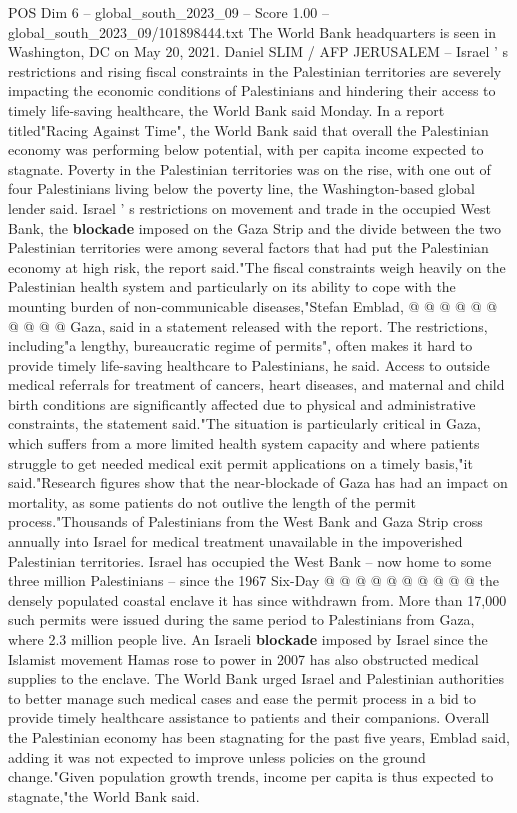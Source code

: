 \begin{textsample}{POS Dim 6 – global\_south\_2023\_09 – Score 1.00 – global\_south\_2023\_09/101898444.txt}  \label{ex:f6_pos_382}
The World Bank headquarters is seen in Washington, DC on May 20, 2021.
Daniel SLIM / AFP JERUSALEM -- Israel ' s restrictions and rising fiscal constraints in the Palestinian territories are severely impacting the economic conditions of Palestinians and hindering their access to timely life-saving healthcare, the World Bank said Monday.
In a report titled"Racing Against Time", the World Bank said that overall the Palestinian economy was performing below potential, with per capita income expected to stagnate.
Poverty in the Palestinian territories was on the rise, with one out of four Palestinians living below the poverty line, the Washington-based global lender said.
Israel ' s restrictions on movement and trade in the occupied West Bank, the \textbf{blockade} imposed on the Gaza Strip and the divide between the two Palestinian territories were among several factors that had put the Palestinian economy at high risk, the report said."The fiscal constraints weigh heavily on the Palestinian health system and particularly on its ability to cope with the mounting burden of non-communicable diseases,"Stefan Emblad, @ @ @ @ @ @ @ @ @ @ Gaza, said in a statement released with the report.
The restrictions, including"a lengthy, bureaucratic regime of permits", often makes it hard to provide timely life-saving healthcare to Palestinians, he said.
Access to outside medical referrals for treatment of cancers, heart diseases, and maternal and child birth conditions are significantly affected due to physical and administrative constraints, the statement said."The situation is particularly critical in Gaza, which suffers from a more limited health system capacity and where patients struggle to get needed medical exit permit applications on a timely basis,"it said."Research figures show that the near-blockade of Gaza has had an impact on mortality, as some patients do not outlive the length of the permit process."Thousands of Palestinians from the West Bank and Gaza Strip cross annually into Israel for medical treatment unavailable in the impoverished Palestinian territories.
Israel has occupied the West Bank -- now home to some three million Palestinians -- since the 1967 Six-Day @ @ @ @ @ @ @ @ @ @ the densely populated coastal enclave it has since withdrawn from.
More than 17,000 such permits were issued during the same period to Palestinians from Gaza, where 2.3 million people live.
An Israeli \textbf{blockade} imposed by Israel since the Islamist movement Hamas rose to power in 2007 has also obstructed medical supplies to the enclave.
The World Bank urged Israel and Palestinian authorities to better manage such medical cases and ease the permit process in a bid to provide timely healthcare assistance to patients and their companions.
Overall the Palestinian economy has been stagnating for the past five years, Emblad said, adding it was not expected to improve unless policies on the ground change."Given population growth trends, income per capita is thus expected to stagnate,"the World Bank said.

\end{textsample}

